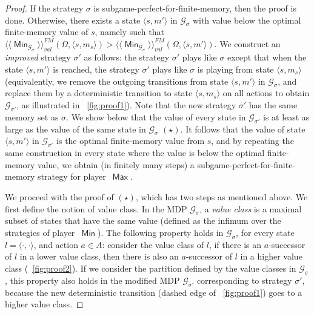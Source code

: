 \documentclass{article}
\newcommand{\tuple}[1]{\langle #1 \rangle}
\newcommand{\GG}{\mathcal{G}}
\newcommand{\winval}[1]{\langle \! \langle #1 \rangle\! \rangle_{\mathit{val}} }
\newcommand{\winvalf}[1]{\winval{#1}^{{FM}}}
\newcommand{\straa}{\sigma}
\DeclareMathOperator{\ma}{\mathsf{Max}}
\DeclareMathOperator{\mi}{\mathsf{Min}}
\begin{document}
\begin{proof}
\smallskip{}
If the strategy $\straa$ is subgame-perfect-for-finite-memory, then the proof is done.
Otherwise, there exists a state $\tuple{s,m'}$ in $\GG_\straa$
with value below the optimal finite-memory value of $s$, 
namely such that $\winvalf{\mi_{\GG_{\straa}}}(\Omega, \tuple{s,m_s}) > \winvalf{\mi_{\GG_{\straa}}}(\Omega, \tuple{s,m'})$.
We construct an \emph{improved} strategy $\straa'$ as follows:
the strategy $\straa'$ plays like $\straa$ except
that when the state $\tuple{s,m'}$ is reached, the strategy $\straa'$ plays
like $\straa$ is playing from state $\tuple{s,m_s}$ (equivalently, we remove the outgoing transitions from state $\tuple{s,m'}$
in $\GG_\straa$, and replace them by a deterministic transition to state $\tuple{s,m_s}$ on all actions
to obtain $\GG_{\straa'}$, as illustrated in \figurename~\ref{fig:proof1}). 
Note that the new strategy $\straa'$ has the same memory set as $\straa$. We show below that
the value of every state in $\GG_{\straa'}$ is at least as large as the value of the 
same state in $\GG_\straa$ $(\star)$. It follows that the value of state $\tuple{s,m'}$ in $\GG_{\straa'}$
is the optimal finite-memory value from $s$, and by repeating the same construction
in every state where the value is below the optimal finite-memory value, we obtain
(in finitely many steps) a subgame-perfect-for-finite-memory strategy for player~$\ma$.

\smallskip{}
We proceed with the proof of $(\star)$, which has two steps as mentioned above.
We first define the notion of value class. 
\smallskip{}
In the MDP $\GG_\straa$, a \emph{value class} is a maximal subset of states that have 
the same value (defined as the infimum over the strategies of player~$\mi$).
The following property holds in $\GG_\straa$, for every state $l = \tuple{\cdot,\cdot}$, and action $a \in A$:
consider the value class of $l$, if there is an $a$-successor of $l$ 
in a lower value class, then there is also an $a$-successor of $l$ in a 
higher value class (\figurename~\ref{fig:proof2}). 
If we consider the partition defined by the value classes
in $\GG_\straa$, this property also holds in the modified MDP $\GG_{\straa'}$ 
corresponding to strategy $\straa'$, because the new deterministic transition 
(dashed edge of  \figurename~\ref{fig:proof1}) goes to a higher value class.


\end{proof}
\end{document}
